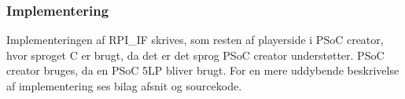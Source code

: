 \documentclass[Rapport/Playerside/RPI_IF/RPI_IF.tex]{subfiles}
\begin{document}
\subsubsection{Implementering}
Implementeringen af RPI\_IF skrives, som resten af playerside i PSoC creator, hvor sproget C er brugt, da det er det sprog PSoC creator understøtter. PSoC creator bruges, da en PSoC 5LP bliver brugt. For en mere uddybende beskrivelse af implementering ses bilag afsnit  og sourcekode. 
\end{document}
